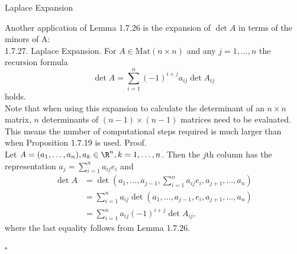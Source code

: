 \documentclass[smaller,hyperref={CJKbookmarks=true}]{beamer}
\begin{document}
\begin{frame}{Laplace Expansion}
\begin{spacing}{1.05}
Another application of Lemma 1.7.26 is the expansion of $\det A$ in terms of
the minors of A:\\[5pt]
\alert{1.7.27. Laplace Expansion.} For $A\in\text{Mat}(n\times n)$ and any $j=1,\ldots,n$ the recursion formula
\begin{equation}\label{1.7.21}
  \det A=\sum_{i=1}^{n}(-1)^{i+j}a_{ij}\det A_{ij}
\end{equation}
holds.\\[6pt]
Note that when using this expansion to calculate the determinant of an $n\times n$ matrix, $n$ determinants of $(n-1)\times(n-1)$ matrices need to be
evaluated. This means the number of computational steps required is
much larger than when Proposition 1.7.19 is used.
\newpage
\alert{Proof.}\\
Let $A=(a_1,\ldots,a_n),a_k\in\R^n,k=1,\ldots,n$. Then the $j$th column has the representation $a_j=\sum_{i=1}^{n}a_{ij}e_i$ and
\begin{equation*}
  \begin{split}
     \det A &=\det\left(a_1,\ldots,a_{j-1},\sum_{i=1}^{n}a_{ij}e_i,a_{j+1},\ldots,a_n\right) \\
       &=\sum_{i=1}^{n}a_{ij}\det\left(a_1,\ldots,a_{j-1},e_i,a_{j+1},\ldots,a_n\right)  \\
       &=\sum_{i=1}^{n}a_{ij}(-1)^{i+j}\det A_{ij},
  \end{split}
\end{equation*}
where the last equality follows from Lemma 1.7.26.
\begin{flushright}
  $\square$
\end{flushright}
\end{spacing}
\end{frame}
\end{document}
